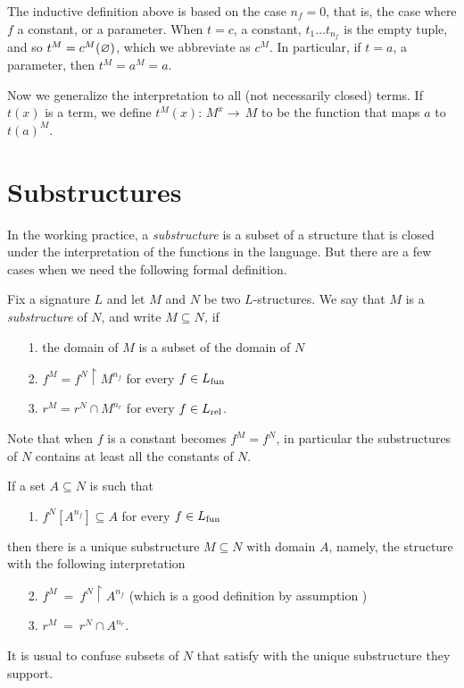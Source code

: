 The inductive definition above is based on the case $n_f=0$, that is, the case where $f$ a constant, or a parameter. 
When $t=c$, a constant, $t_1\dots t_{n_f}$ is the empty tuple, and so $t^M=c^M(\varnothing)$, which we abbreviate as $c^M$. In particular, if $t=a$, a parameter, then $t^M=a^M=a$.

Now we generalize the interpretation to all (not necessarily closed) terms.
If $t(x)$ is a term, we define \emph{$t^M\!(x) :\,M^{x}\to\, M$} to be the function that maps $a$ to $t(a)^M$.

\section{Substructures}
\label{sottostrutture}


\def\medrel#1{\parbox[t]{6ex}{$\displaystyle\hfil #1$}}
\def\ceq#1#2#3{\parbox{10ex}{$\displaystyle #1$}\medrel{#2}$\displaystyle  #3$}

In the working practice, 
a \textit{substructure\/} is a subset of a structure that is closed under the interpretation of the functions in the language. 
But there are a few cases when we need the following formal definition.

\begin{definition}\label{sottostrutturadef}
Fix a signature $L$ and let $M$ and $N$ be two $L$-structures. We say that $M$ is a \emph{substructure\/} of $N$, and write \emph{$M\subseteq N$,} if
\begin{itemize}
\item[1.] the domain of $M$ is a subset of the domain of $N$
\item[2.] $f^M=f^N\restriction M^{n_f}$ for every $f\in L_{\rm fun}$
\item[3.] $r^M=r^N\cap M^{n_r}$ for every $f\in L_{\rm rel}$.
\end{itemize}
\end{definition}

Note that when $f$ is a constant  becomes $f^M=f^N$, in particular the substructures of $N$ contains at least all the constants of $N$.

If a set $A\subseteq N$ is such that 
\begin{itemize}
\item[1.] $f^N[A^{n_f}]\subseteq A$ for every  $f\in L_{\rm fun}$ 
\end{itemize}
then there is a unique substructure $M\subseteq N$ with domain $A$, namely, the structure with the following interpretation
\begin{itemize}
\item[2.] $f^M\ =\ f^N\restriction A^{n_f}$ (which is a good definition by assumption )
\item[3.] $r^M\ =\ r^N\cap A^{n_r}$.
\end{itemize}
It is usual to confuse subsets of $N$ that satisfy  with the unique substructure they support.

